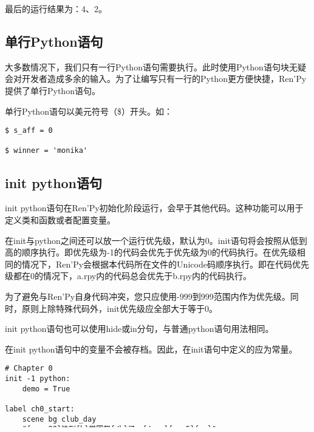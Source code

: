 最后的运行结果为：4、2。

\subsection{单行Python语句}
大多数情况下，我们只有一行Python语句需要执行。此时使用Python语句块无疑会对开发者造成多余的输入。为了让编写只有一行的Python更方便快捷，Ren'Py提供了单行Python语句。

单行Python语句以美元符号（\$）开头。如：
\begin{lstlisting}
$ s_aff = 0

$ winner = 'monika'
\end{lstlisting}

\subsection{init python语句}
init python语句在Ren'Py初始化阶段运行，会早于其他代码。这种功能可以用于定义类和函数或者配置变量。
\begin{ExtraKnowledge}
    在init与python之间还可以放一个运行优先级，默认为0。init语句将会按照从低到高的顺序执行。即优先级为-1的代码会优先于优先级为0的代码执行。在优先级相同的情况下，Ren'Py会根据本代码所在文件的Unicode码顺序执行。即在代码优先级都在0的情况下，a.rpy内的代码总会优先于b.rpy内的代码执行。
\end{ExtraKnowledge}

\begin{Attention}
    为了避免与Ren'Py自身代码冲突，您只应使用-999到999范围内作为优先级。同时，原则上除特殊代码外，init优先级应全部大于等于0。
\end{Attention}

init python语句也可以使用hide或in分句，与普通python语句用法相同。

在init python语句中的变量不会被存档。因此，在init语句中定义的应为常量。

\begin{lstlisting}
# Chapter 0
init -1 python:
    demo = True

label ch0_start:
    scene bg club_day
    "{cps=20}快到{b}学园祭{/b}了。{/cps}{w=.5}{nw}"
    show monika 1a at l41 zorder 1
    m "各位！我们得开始准备了！"
    show sayori 1a at h42 zorder 1
    s "好耶！！！！"
    show natsuki 1a at t43 zorder 1
    n 2d "啊，我都等不及学园祭了。"
    n "肯定会很棒的！"
    show yuri 1a at s44 zorder 1
    y "..."
    scene bg club_day
    show monika 2a at t21 zorder 1
    show sayori 2a at t22 zorder 1
    m "那么，是时候来进行分工了。"
    m 4k "[player],你想要做什么? "

    if demo:
        "Demo 版剧情到此结束。"
        return

    menu:
        "做小蛋糕":
            s "夏树的小蛋糕最好吃了！"
            python:
                $ n_aff += 1
                $ m_aff -= 1
        "布置教室":
            m "那我们可得抓紧时间了！"
            python:
                $ m_aff += 1
                $ n_aff -= 1
    return

\end{lstlisting}

